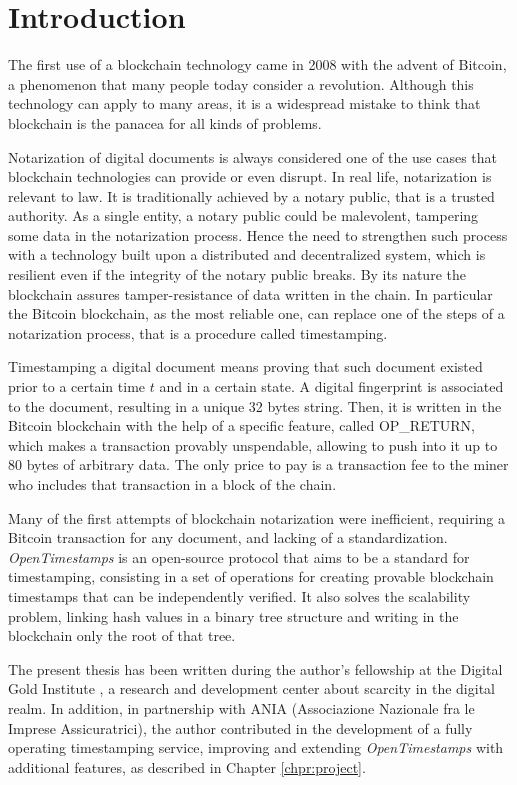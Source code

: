 \chapter{Introduction}
\label{chpr:intro}
The first use of a blockchain technology came in 2008 with the advent of Bitcoin, a phenomenon that many people today consider a revolution. Although this technology can apply to many areas, it is a widespread mistake to think that blockchain is the panacea for all kinds of problems.

\bigskip
\noindent
Notarization of digital documents is always considered one of the use cases that blockchain technologies can provide or even disrupt. In real life, notarization is relevant to law. It is traditionally achieved by a notary public, that is a trusted authority. As a single entity, a notary public could be malevolent, tampering some data in the notarization process.
Hence the need to strengthen such process with a technology built upon a distributed and decentralized system, which is resilient even if the integrity of the notary public breaks. By its nature the blockchain assures tamper-resistance of data written in the chain. In particular the Bitcoin blockchain, as the most reliable one, can replace one of the steps of a notarization process, that is a procedure called timestamping.

\bigskip
\noindent
Timestamping a digital document means proving that such document existed prior to a certain time $t$ and in a certain state. A digital fingerprint is associated to the document, resulting in a unique 32 bytes string. Then, it is written in the Bitcoin blockchain with the help of a specific feature, called OP\_RETURN, which makes a transaction provably unspendable, allowing to push into it up to 80 bytes of arbitrary data. The only price to pay is a transaction fee to the miner who includes that transaction in a block of the chain.

\bigskip
\noindent
Many of the first attempts of blockchain notarization were inefficient, requiring a Bitcoin transaction for any document, and lacking of a standardization. \textit{OpenTimestamps} is an open-source protocol that aims to be a standard for timestamping, consisting in a set of operations for creating provable blockchain timestamps that can be independently verified. It also solves the scalability problem, linking hash values in a binary tree structure and writing in the blockchain only the root of that tree.

\bigskip
\noindent
The present thesis has been written during the author's fellowship at the Digital Gold Institute \cite{DGI}, a research and development center about scarcity in the digital realm. In addition, in partnership with ANIA (Associazione Nazionale fra le Imprese Assicuratrici), the author contributed in the development of a fully operating timestamping service, improving and extending \textit{OpenTimestamps} with additional features, as described in Chapter \ref{chpr:project}.

